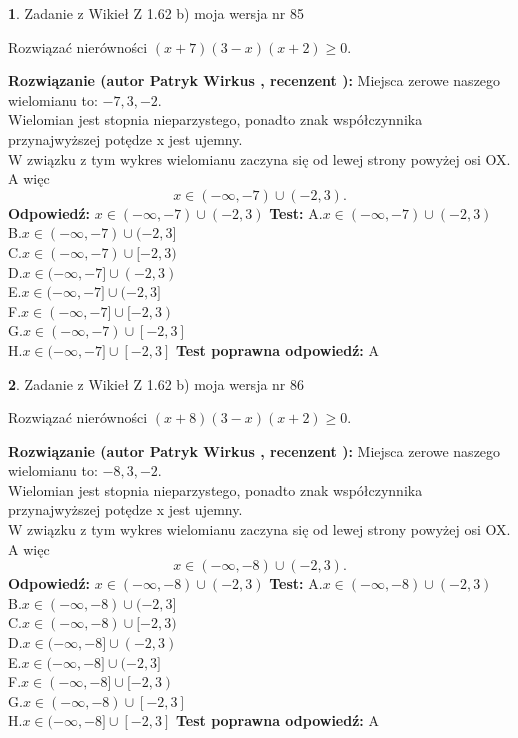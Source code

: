 \documentclass[12pt, a4paper]{article}
\theoremstyle{definition} %
\newtheorem{zad}{}
\newcommand{\zadStart}[1]{\begin{zad}#1\newline}
\newcommand{\zadStop}{\end{zad}}
\newcommand{\rozwStart}[2]{\noindent \textbf{Rozwiązanie (autor #1 , recenzent #2): }\newline}
\newcommand{\rozwStop}{\newline}
\newcommand{\odpStart}{\noindent \textbf{Odpowiedź:}\newline}
\newcommand{\odpStop}{\newline}
\newcommand{\testStart}{\noindent \textbf{Test:}\newline}
\newcommand{\testStop}{\newline}
\newcommand{\kluczStart}{\noindent \textbf{Test poprawna odpowiedź:}\newline}
\newcommand{\kluczStop}{\newline}
\begin{document}
\zadStart{Zadanie z Wikieł Z 1.62 b) moja wersja nr 85}

Rozwiązać nierówności $(x+7)(3-x)(x+2)\ge0$.
\zadStop
\rozwStart{Patryk Wirkus}{}
Miejsca zerowe naszego wielomianu to: $-7, 3, -2$.\\
Wielomian jest stopnia nieparzystego, ponadto znak współczynnika przy\linebreak najwyższej potędze x jest ujemny.\\ W związku z tym wykres wielomianu zaczyna się od lewej strony powyżej osi OX. A więc $$x \in (-\infty,-7) \cup (-2,3).$$
\rozwStop
\odpStart
$x \in (-\infty,-7) \cup (-2,3)$
\odpStop
\testStart
A.$x \in (-\infty,-7) \cup (-2,3)$\\
B.$x \in (-\infty,-7) \cup (-2,3]$\\
C.$x \in (-\infty,-7) \cup [-2,3)$\\
D.$x \in (-\infty,-7] \cup (-2,3)$\\
E.$x \in (-\infty,-7] \cup (-2,3]$\\
F.$x \in (-\infty,-7] \cup [-2,3)$\\
G.$x \in (-\infty,-7) \cup [-2,3]$\\
H.$x \in (-\infty,-7] \cup [-2,3]$
\testStop
\kluczStart
A
\kluczStop



\zadStart{Zadanie z Wikieł Z 1.62 b) moja wersja nr 86}

Rozwiązać nierówności $(x+8)(3-x)(x+2)\ge0$.
\zadStop
\rozwStart{Patryk Wirkus}{}
Miejsca zerowe naszego wielomianu to: $-8, 3, -2$.\\
Wielomian jest stopnia nieparzystego, ponadto znak współczynnika przy\linebreak najwyższej potędze x jest ujemny.\\ W związku z tym wykres wielomianu zaczyna się od lewej strony powyżej osi OX. A więc $$x \in (-\infty,-8) \cup (-2,3).$$
\rozwStop
\odpStart
$x \in (-\infty,-8) \cup (-2,3)$
\odpStop
\testStart
A.$x \in (-\infty,-8) \cup (-2,3)$\\
B.$x \in (-\infty,-8) \cup (-2,3]$\\
C.$x \in (-\infty,-8) \cup [-2,3)$\\
D.$x \in (-\infty,-8] \cup (-2,3)$\\
E.$x \in (-\infty,-8] \cup (-2,3]$\\
F.$x \in (-\infty,-8] \cup [-2,3)$\\
G.$x \in (-\infty,-8) \cup [-2,3]$\\
H.$x \in (-\infty,-8] \cup [-2,3]$
\testStop
\kluczStart
A
\kluczStop
\end{document}
